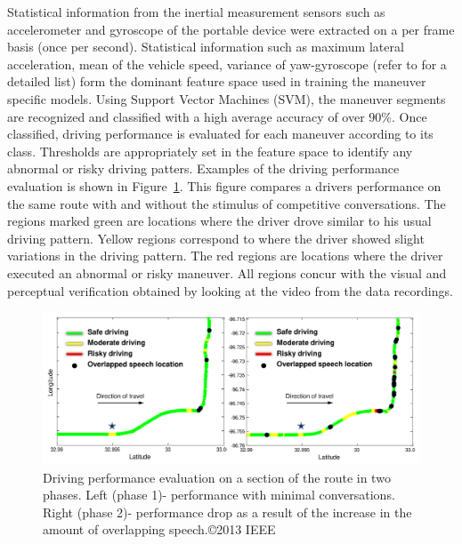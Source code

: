 Statistical information from the inertial measurement sensors such as accelerometer and gyroscope of the portable device were extracted on a per frame basis (once per second). 
Statistical information such as maximum lateral acceleration, mean of the vehicle speed, variance of yaw-gyroscope (refer to \cite{sathyanarayanaITSC2012} for a detailed list) form the dominant feature space used in training the maneuver specific models. 
Using Support Vector Machines (SVM), the maneuver segments are recognized and classified with a high average accuracy of over $90\%$. 
Once classified, driving performance is evaluated for each maneuver according to its class. 
Thresholds are appropriately set in the feature space to identify any abnormal or risky driving patters. 
Examples of the driving performance evaluation is shown in Figure~\ref{fig:ch6_driving_performance}. 
This figure compares a drivers performance on the same route with and without the stimulus of competitive conversations. 
The regions marked green are locations where the driver drove similar to his usual driving pattern. Yellow regions correspond to where the driver showed slight variations in the driving pattern. 
The red regions are locations where the driver executed an abnormal or risky maneuver. 
All regions concur with the visual and perceptual verification obtained by looking at the video from the data recordings. 

\begin{figure}[h!]
	\centering
	\includegraphics[scale=0.6]{figures/driving_and_overlap}
	\vspace{-5mm}
	\caption {Driving performance evaluation on a section of the route in two phases. Left (phase 1)-  performance with minimal conversations. Right (phase 2)- performance drop as a result of the increase in the amount of overlapping speech.\copyright 2013 IEEE}
	\label{fig:ch6_driving_performance}
	\vspace{-5mm}
\end{figure}


